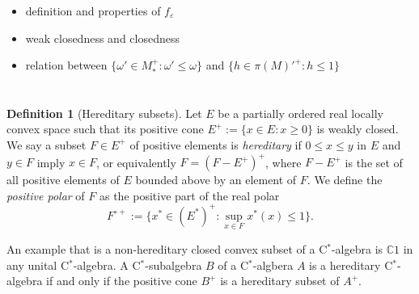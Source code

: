 \documentclass[a4paper]{amsart}
\newcommand{\e}{\varepsilon}
\theoremstyle{plain}
\theoremstyle{definition}
\newtheorem{defn}[thm]{Definition}
\begin{document}
\begin{itemize}
\item definition and properties of $f_\e$
\item weak closedness and closedness
\item relation between $\{\omega'\in M_*^+:\omega'\le\omega\}$ and $\{h\in\pi(M)'^+:h\le1\}$
\end{itemize}


\section{}



\begin{defn}[Hereditary subsets]
Let $E$ be a partially ordered real locally convex space such that its positive cone $E^+:=\{x\in E:x\ge0\}$ is weakly closed.
We say a subset $F\in E^+$ of positive elements is \emph{hereditary} if $0\le x\le y$ in $E$ and $y\in F$ imply $x\in F$, or equivalently $F=(F-E^+)^+$, where $F-E^+$ is the set of all positive elements of $E$ bounded above by an element of $F$.
We define the \emph{positive polar} of $F$ as the positive part of the real polar
\[F^{\circ+}:=\{x^*\in(E^*)^+:\sup_{x\in F}x^*(x)\le1\}.\]
\end{defn}
An example that is a non-hereditary closed convex subset of a C$^*$-algebra is $\mathbb{C}1$ in any unital C$^*$-algebra.
A C$^*$-subalgebra $B$ of a C$^*$-algbera $A$ is a hereditary C$^*$-algebra if and only if the positive cone $B^+$ is a hereditary subset of $A^+$.
\end{document}
